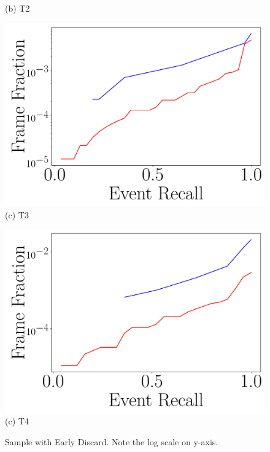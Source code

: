 \begin{figure}
\begin{minipage}[]{0.47\linewidth}
        {(b) T2}
    \end{minipage}
    \begin{minipage}[]{0.47\linewidth}
        \centering
        \includegraphics[trim={0.5cm 0.5cm 0 0},clip,width=\linewidth]{FIGS/fig-random-select-and-filter-recall-frame-raft-aggregated.pdf}
        {(c) T3}
    \end{minipage}
    \begin{minipage}[]{0.47\linewidth}
        \centering
        \includegraphics[trim={0.5cm 0.5cm 0 0},clip,width=\linewidth]{FIGS/fig-random-select-and-filter-recall-frame-elephant-aggregated.pdf}
        {(c) T4}
    \end{minipage}
    \caption{Sample with Early Discard. Note the log scale on y-axis.}
    \label{fig:sampling-discard}
\end{figure}

